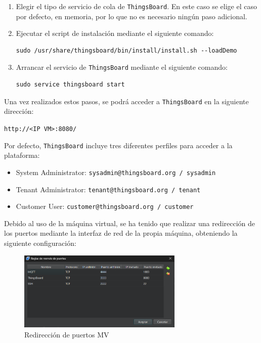 \begin{enumerate}
    \item Elegir el tipo de servicio de cola de \texttt{ThingsBoard}. En este caso se elige el caso por defecto, en memoria, por lo que no es necesario ningún paso adicional.

    \item Ejecutar el script de instalación mediante el siguiente comando:
    \begin{verbatim}
sudo /usr/share/thingsboard/bin/install/install.sh --loadDemo
    \end{verbatim}

    \item Arrancar el servicio de \texttt{ThingsBoard} mediante el siguiente comando:
    \begin{verbatim}
sudo service thingsboard start
    \end{verbatim}
\end{enumerate}

Una vez realizados estos pasos, se podrá acceder a \texttt{ThingsBoard} en la siguiente dirección: 

\texttt{http://<IP VM>:8080/}

Por defecto, \texttt{ThingsBoard} incluye tres diferentes perfiles para acceder a la plataforma:
\begin{itemize}
    \item System Administrator: \texttt{sysadmin@thingsboard.org / sysadmin}
    \item Tenant Administrator: \texttt{tenant@thingsboard.org / tenant}
    \item Customer User: \texttt{customer@thingsboard.org / customer}
\end{itemize}

Debido al uso de la máquina virtual, se ha tenido que realizar una redirección de los puertos mediante la interfaz de red de la propia máquina, obteniendo la siguiente configuración:

\begin{figure}[H]
    \centering
    \includegraphics[width=0.7\textwidth]{images/3-software/3-2-2-thingsboard/PuertosMV.png}
    \caption{Redirección de puertos MV}
    \label{fig:3-2-2-PuertosMV}
\end{figure}


